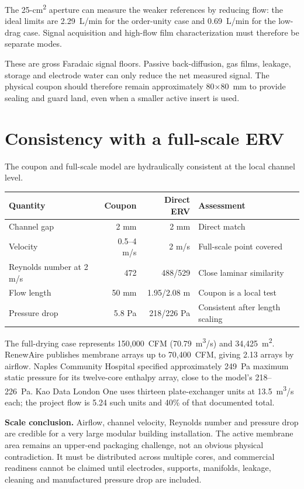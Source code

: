 \documentclass[9pt,a4paper]{article}
\begin{document}
The 25-cm\textsuperscript{2} aperture can measure the weaker references by
reducing flow: the ideal limits are 2.29~L/min for the order-unity case and
0.69~L/min for the low-drag case. Signal acquisition and high-flow film
characterization must therefore be separate modes.

\begin{warningbox}
These are gross Faradaic signal floors. Passive back-diffusion, gas films,
leakage, storage and electrode water can only reduce the net measured signal.
The physical coupon should therefore remain approximately 80$\times$80~mm to
provide sealing and guard land, even when a smaller active insert is used.
\end{warningbox}

\section{Consistency with a full-scale ERV}

The coupon and full-scale model are hydraulically consistent at the local
channel level.

\begin{tabularx}{\textwidth}{@{}YrrY@{}}
\toprule
\textbf{Quantity} & \textbf{Coupon} & \textbf{Direct ERV} & \textbf{Assessment} \\
\midrule
Channel gap & 2 mm & 2 mm & Direct match \\
Velocity & 0.5--4 m/s & 2 m/s & Full-scale point covered \\
Reynolds number at 2 m/s & 472 & 488/529 & Close laminar similarity \\
Flow length & 50 mm & 1.95/2.08 m & Coupon is a local test \\
Pressure drop & 5.8 Pa & 218/226 Pa & Consistent after length scaling \\
\bottomrule
\end{tabularx}

The full-drying case represents 150,000~CFM (70.79~m\textsuperscript{3}/s) and
34,425~m\textsuperscript{2}. RenewAire publishes membrane arrays up to
70,400~CFM, giving 2.13 arrays by airflow. Naples Community Hospital specified
approximately 249~Pa maximum static pressure for its twelve-core enthalpy array,
close to the model's 218--226~Pa. Kao Data London One uses thirteen
plate-exchanger units at 13.5~m\textsuperscript{3}/s each; the project flow is
5.24 such units and 40\% of that documented total.

\begin{mainbox}
\textbf{Scale conclusion.} Airflow, channel velocity, Reynolds number and
pressure drop are credible for a very large modular building installation.
The active membrane area remains an upper-end packaging challenge, not an
obvious physical contradiction. It must be distributed across multiple cores,
and commercial readiness cannot be claimed until electrodes, supports,
manifolds, leakage, cleaning and manufactured pressure drop are included.
\end{mainbox}
\end{document}
